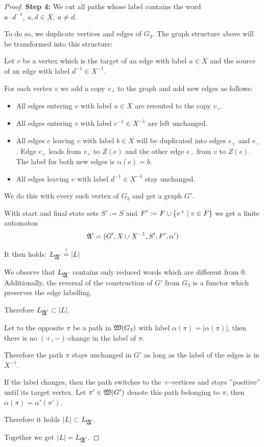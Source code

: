 \begin{proof}
{\bf Step 4:} We cut all paths whose label contains the word $a \cdot
d^{-1},\ a, d \in X,\ a \neq d$.

\begin{center}

\end{center}

To do so, we duplicate vertices and edges of $G_3$. The graph structure
above will be transformed into this structure:

\begin{center}

\end{center}

Let $v$ be a vertex which is the target of an edge with label $a \in X$ and the
source of an edge with label $d^{-1} \in X^{-1}$.

For each vertex $v$ we add a copy $v_{+}$ to the graph and add new edges as
follows:
\begin{itemize}
  \item All edges entering $v$ with label $a \in X$ are rerouted to the copy
  $v_{+}$.
  \item All edges entering $v$ with label $c^{-1} \in X^{-1}$ are left
  unchanged.
  \item All edges $e$ leaving $v$ with label $b \in X$ will be
  duplicated into edges $e_{+}$ and $e_{-}$. Edge $e_{+}$ leads from $v_{+}$
  to $Z(e)$ and the other edge $e_{-}$ from $v$ to $Z(e)$. The label for
  both new edges is $\alpha(e) = b$.
	\item All edges leaving $v$ with label $d^{-1} \in X^{-1}$ stay unchanged.
\end{itemize}
We do this with every such vertex of $G_3$ and get a graph $G'$.

With start and final state sets $S' := S$ and $F' := F \cup \mbox{$\{v^+ \mid v
\in F\}$}$ we get a finite automaton
\[ \mbox{$\mathfrak{A}$}' = (G', X \cup {X}^{-1}, S', F', \alpha') \]

It then holds: $L_{\mbox{$\mathfrak{A}$}'} \stackrel{!}{=} |L|$

We observe that $L_{\mbox{$\mathfrak{A}$}'}$ contains only reduced words which are different
from $0$. Additionally, the reversal of the construction of $G'$ from $G_3$ is a
functor which preserves the edge labelling.

Therefore $L_{\mbox{$\mathfrak{A}$}'} \subset |L|$.

\bigskip
Let to the opposite $\pi$ be a path in $\mbox{$\mathfrak{W}({G_3})$}$ with label $\alpha(\pi)
= |\alpha(\pi)|$, then there is no $(+, -)$-change in the label of $\pi$.

Therefore the path $\pi$ stays unchanged in $G'$ as long as the label
of the edges is in $X^{-1}$.

If the label changes, then the path switches to the $+$-vertices and stays
''positive'' until its target vertex. Let $\pi' \in \mbox{$\mathfrak{W}({G'})$}$ denote this
path belonging to $\pi$, then $\alpha(\pi) = \alpha'(\pi')$.

Therefore it holds $|L| \subset L_{\mbox{$\mathfrak{A}$}'}$.

Together we get $|L| = L_{\mbox{$\mathfrak{A}$}'}$.
\end{proof}

